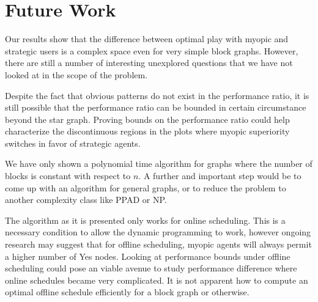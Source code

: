 \documentclass{article}
\begin{document}
\section{Future Work}

Our results show that the difference between optimal play with myopic
and strategic users is a complex space even for very simple block
graphs. However, there are still a number of interesting unexplored
questions that we have not looked at in the scope of the problem.

Despite the fact that obvious patterns do not exist in the performance
ratio, it is still possible that the performance ratio can be bounded
in certain circumstance beyond the star graph. Proving bounds on the
performance ratio could help characterize the discontinuous regions in
the plots where myopic superiority switches in favor of strategic
agents.

We have only shown a polynomial time algorithm for graphs where the
number of blocks is constant with respect to $n$. A further and
important step would be to come up with an algorithm for general
graphs, or to reduce the problem to another complexity class like PPAD
or NP.

The algorithm as it is presented only works for online
scheduling. This is a necessary condition to allow the dynamic
programming to work, however ongoing research may suggest that for
offline scheduling, myopic agents will always permit a higher number
of Yes nodes. Looking at performance bounds under offline scheduling
could pose an viable avenue to study performance difference where
online schedules became very complicated. It is not apparent how to
compute an optimal offline schedule efficiently for a block graph or
otherwise.



\end{document}
